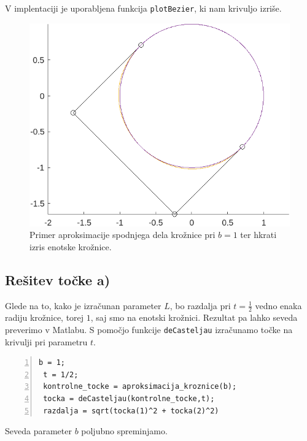 \documentclass[a4paper,12pt]{article}
\begin{document}
	\noindent V implentaciji je uporabljena funkcija \lstinline[style=Matlab-editor]!plotBezier!, ki nam krivuljo izriše.
	
	\begin{figure}[h]
		\centering
		\includegraphics[scale=0.7]{slika2.png}
		\caption{Primer aproksimacije spodnjega dela krožnice pri $b = 1$ ter hkrati izris enotske krožnice.}
	\end{figure}
	
	
	\subsection{Rešitev točke a)}

	Glede na to, kako je izračunan parameter $L$, bo razdalja pri $t=\frac{1}{2}$ vedno enaka radiju krožnice, torej $1$, saj smo na enotski
	krožnici. Rezultat pa lahko seveda preverimo v Matlabu. S pomočjo funkcije \lstinline[style=Matlab-editor]!deCasteljau! izračunamo točke na krivulji pri
	parametru $t$.

	\begin{lstlisting}[style=Matlab-editor,	numbers=left,]
 b = 1;
 t = 1/2;
 kontrolne_tocke = aproksimacija_kroznice(b);
 tocka = deCasteljau(kontrolne_tocke,t);
 razdalja = sqrt(tocka(1)^2 + tocka(2)^2)
	\end{lstlisting}

	\noindent Seveda parameter $b$ poljubno spreminjamo. 
\end{document}
